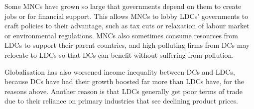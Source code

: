 \documentclass[Economics.tex]{subfiles}
\begin{document}
Some MNCs have grown so large that governments depend on them to create jobs or for financial support. This allows MNCs to lobby LDCs' governments to craft policies to their advantage, such as tax cuts or relaxation of labour market or environmental regulations. MNCs also sometimes consume resources from LDCs to support their parent countries, and high-polluting firms from DCs may relocate to LDCs so that DCs can benefit without suffering from pollution.

Globalisation has also worsened income inequality between DCs and LDCs, because DCs have had their growth boosted far more than LDCs have, for the reasons above. Another reason is that LDCs generally get poor terms of trade due to their reliance on primary industries that see declining product prices.
\end{document}
